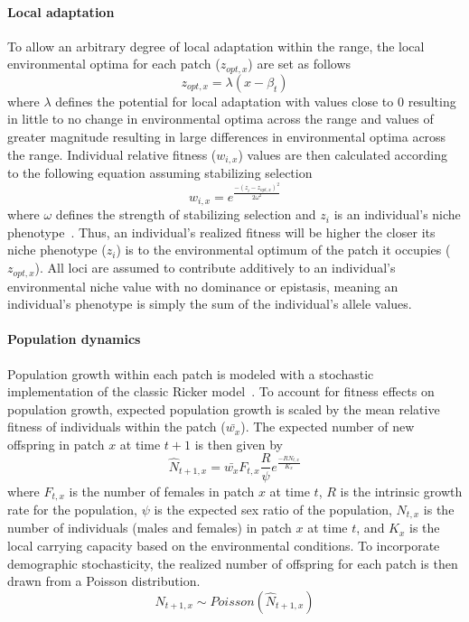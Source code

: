 \documentclass[11pt]{article}
\begin{document}
\paragraph{Local adaptation}
To allow an arbitrary degree of local adaptation within the range, the local environmental optima for each patch ($z_{opt,x}$) are set as follows
\begin{equation}
z_{opt,x}=\lambda(x-\beta_{t})
\end{equation}
where $\lambda$ defines the potential for local adaptation with values close to $0$ resulting in little to no change in environmental optima across the range and values of greater magnitude resulting in large differences in environmental optima across the range. Individual relative fitness ($w_{i,x}$) values are then calculated according to the following equation assuming stabilizing selection
\begin{equation}
w_{i,x}=e^{\frac{-(z_{i}-z_{opt,x})^{2}}{2\omega^{2}}}
\end{equation}
where $\omega$ defines the strength of stabilizing selection and $z_{i}$ is an individual's niche phenotype~\citep{lande1976natural}. Thus, an individual's realized fitness will be higher the closer its niche phenotype ($z_{i}$) is to the environmental optimum of the patch it occupies ($z_{opt,x}$). All loci are assumed to contribute additively to an individual's environmental niche value with no dominance or epistasis, meaning an individual's phenotype is simply the sum of the individual's allele values.

\paragraph{Population dynamics}
Population growth within each patch is modeled with a stochastic implementation of the classic Ricker model~\citep{ricker1954stock, melbourne2008extinction}. To account for fitness effects on population growth, expected population growth is scaled by the mean relative fitness of individuals within the patch ($\bar{w_{x}}$). The expected number of new offspring in patch $x$ at time $t+1$ is then given by
\begin{equation}
\hat{N}_{t+1,x}=\bar{w_{x}}F_{t,x}\frac{R}{\psi}e^{\frac{-RN_{t,x}}{K_{x}}}
\end{equation}
where $F_{t,x}$ is the number of females in patch $x$ at time $t$, $R$ is the intrinsic growth rate for the population, $\psi$ is the expected sex ratio of the population, $N_{t,x}$ is the number of individuals (males and females) in patch $x$ at time $t$, and $K_{x}$ is the local carrying capacity based on the environmental conditions. To incorporate demographic stochasticity, the realized number of offspring for each patch is then drawn from a Poisson distribution.
\begin{equation}
N_{t+1,x}\sim Poisson(\hat{N}_{t+1,x})
\end{equation}
\end{document}
